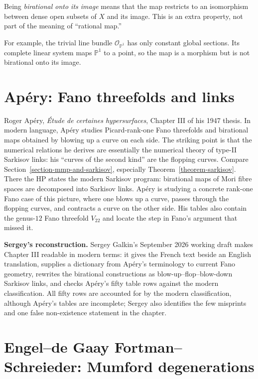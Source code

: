 Being \textit{birational onto its image}
means that the map restricts to an
isomorphism between dense open subsets
of $X$ and its image. This is an extra
property, not part of the meaning of
``rational map.''

For example, the trivial line bundle
$\mathcal{O}_{\mathbb{P}^1}$ has only
constant global sections. Its complete
linear system maps $\mathbb{P}^1$ to a
point, so the map is a morphism but is
not birational onto its image.

\section{Apéry: Fano threefolds and links}
\label{section-apery-fano-links}

\noindent
Roger Apéry, \textit{Étude de certaines
hypersurfaces}, Chapter III of his 1947
thesis. In modern language, Apéry studies
Picard-rank-one Fano threefolds and
birational maps obtained by blowing up a
curve on each side. The striking point is
that the numerical relations he derives
are essentially the numerical theory of
type-II Sarkisov links: his ``curves of the
second kind'' are the flopping curves.
Compare Section~\ref{section-mmp-and-sarkisov},
especially Theorem~\ref{theorem-sarkisov}.
There the HP states the modern Sarkisov
program: birational maps of Mori fibre
spaces are decomposed into Sarkisov links.
Apéry is studying a concrete rank-one Fano
case of this picture, where one blows up a
curve, passes through the flopping curves,
and contracts a curve on the other side.
His tables also contain the genus-$12$ Fano
threefold $V_{22}$ and locate the step in
Fano's argument that missed it.

\medskip\noindent
\textbf{Sergey's reconstruction.}
Sergey Galkin's September 2026 working
draft makes Chapter III readable in modern
terms: it gives the French text beside an
English translation, supplies a dictionary
from Apéry's terminology to current Fano
geometry, rewrites the birational
constructions as blow-up--flop--blow-down
Sarkisov links, and checks Apéry's fifty
table rows against the modern
classification. All fifty rows are
accounted for by the modern
classification, although Apéry's tables
are incomplete; Sergey also identifies the
few misprints and one false non-existence
statement in the chapter.

\section{Engel--de Gaay Fortman--Schreieder:
Mumford degenerations}
\label{section-mumford-survey}

